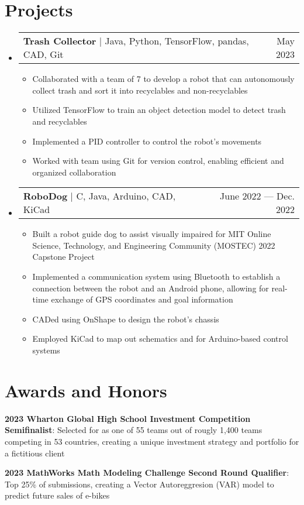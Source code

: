 \documentclass[letterpaper,11pt]{article}
\makeatletter
\newcommand{\resumeItem}[1]{
  \item\small{
    {#1 \vspace{-2pt}}
  }
}
\newcommand{\resumeProjectHeading}[2]{
    \item
    \begin{tabular*}{0.97\textwidth}{l@{\extracolsep{\fill}}r}
      \small#1 & #2 \\
    \end{tabular*}\vspace{-7pt}
}
\newcommand{\resumeSubHeadingListStart}{\begin{itemize}[leftmargin=0.15in, label={}]}
\newcommand{\resumeSubHeadingListEnd}{\end{itemize}}
\newcommand{\resumeItemListStart}{\begin{itemize}}
\newcommand{\resumeItemListEnd}{\end{itemize}\vspace{-5pt}}
\makeatother
\begin{document}
\section{Projects}
    \resumeSubHeadingListStart
    \resumeProjectHeading
    {\textbf{Trash Collector} $|$ {Java, Python, TensorFlow, pandas, CAD, Git}}{May 2023}
    \resumeItemListStart
      \resumeItem{Collaborated with a team of 7 to develop a robot that can autonomously collect trash and sort it into recyclables and non-recyclables}
      \resumeItem{Utilized TensorFlow to train an object detection model to detect trash and recyclables}
      \resumeItem{Implemented a PID controller to control the robot's movements}
      \resumeItem{Worked with team using Git for version control, enabling efficient and organized collaboration}
    \resumeItemListEnd
      \resumeProjectHeading
          {\textbf{RoboDog} $|$ {C, Java, Arduino, CAD, KiCad}}{June 2022 --- Dec. 2022}
          \resumeItemListStart
            \resumeItem{Built a robot guide dog to assist visually impaired for MIT Online Science, Technology, and Engineering Community (MOSTEC) 2022 Capstone Project}
            \resumeItem{Implemented a communication system using Bluetooth to establish a connection between the robot and an Android phone, allowing for real-time exchange of GPS coordinates and goal information}
            \resumeItem{CADed using OnShape to design the robot's chassis}
            \resumeItem{Employed KiCad to map out schematics and for Arduino-based control systems}
          \resumeItemListEnd
    \resumeSubHeadingListEnd

\section{Awards and Honors}
    \begin{itemize}[leftmargin=0.15in]
        \small{
            \item{\textbf{2023 Wharton Global High School Investment Competition Semifinalist}{: Selected for as one of 55 teams out of rougly 1,400 teams competing in 53 countries, creating a unique investment strategy and portfolio for a fictitious client}}
            \item {\textbf{2023 MathWorks Math Modeling Challenge Second Round Qualifier}{: Top 25\% of submissions, creating a Vector Autoreggresion (VAR) model to predict future sales of e-bikes}}
        }
 \end{itemize}
\end{document}
